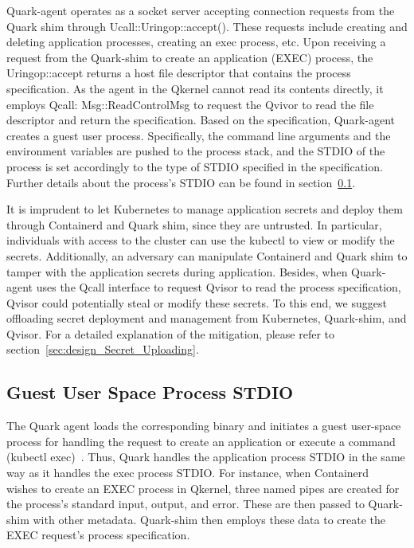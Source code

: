 Quark-agent operates as a socket server accepting connection requests from the Quark shim through Ucall::Uringop::accept(). These requests include creating and deleting application processes, creating an exec process, etc. Upon receiving a request from the Quark-shim to create an application (EXEC) 
 process, the Uringop::accept returns a host file descriptor that contains the process specification. As the agent in the Qkernel cannot read its contents directly, it employs Qcall: Msg::ReadControlMsg to request the Qvivor to read the file descriptor and return the specification. Based on the 
 specification, Quark-agent creates a guest user process. Specifically, the command line arguments and the environment variables are pushed to the process stack, and the STDIO of the process is set accordingly to the type of STDIO specified in the specification. Further details about the process’s 
 STDIO can be found in section~\ref*{sec:security_analyse_STDIO}.

It is imprudent to let Kubernetes to manage application secrets and deploy them through Containerd and Quark shim, since they are untrusted. In particular, individuals with access to the cluster can use the kubectl to view or modify the  secrets. Additionally, an adversary can manipulate Containerd 
and Quark shim to tamper with the application secrets during application. Besides, when Quark-agent uses the Qcall interface to request Qvisor to read the process specification, Qvisor could potentially steal or modify these secrets. To this end, we suggest offloading secret deployment and management 
from Kubernetes, Quark-shim, and Qvisor. For a detailed explanation of the mitigation, please refer to section~\ref*{sec:design_Secret_Uploading}.

\subsection{Guest User Space Process STDIO}
\label{sec:security_analyse_STDIO}

The Quark agent loads the corresponding binary and initiates a guest user-space process for handling the request to create an application or execute a command (kubectl exec)~\cite*{k8s}. Thus, Quark handles the application process STDIO in the same way as it handles the exec process STDIO. For instance, 
when Containerd~\cite*{containerd} wishes to create an EXEC process in Qkernel, three named pipes are created for the process’s standard input, output, and error. These are then passed to Quark-shim with other metadata. Quark-shim then employs these data to create the  EXEC request’s process 
specification.

